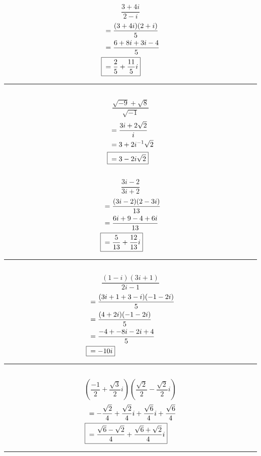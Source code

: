 	\subsection{}
		\[\frac{3 + 4i}{2 - i}\]
		\begin{align*}
			&= \frac{(3 + 4i)(2 + i)}{5} \\
			&= \frac{6 + 8i + 3i - 4}{5} \\
			\Aboxed{{} &= \frac{2}{5} + \frac{11}{5}i}
		\end{align*}
		\hrule{}

	\subsection{}
		\[\frac{\sqrt{-9} + \sqrt{8}}{\sqrt{-1}}\]
		\begin{align*}
			&= \frac{3i + 2\sqrt{2}}{i} \\
			&= 3 + 2i^{-1}\sqrt{2} \\
			\Aboxed{{} &= 3 - 2i\sqrt{2}}
		\end{align*}

	\subsection{}
		\[\frac{3i - 2}{3i + 2}\]
		\begin{align*}
			&= \frac{(3i - 2)(2 - 3i)}{13} \\
			&= \frac{6i + 9 - 4 + 6i}{13} \\
			\Aboxed{{} &= \frac{5}{13} + \frac{12}{13}i}
		\end{align*}
		\hrule{}

	\subsection{}
		\[\frac{(1 - i)(3i + 1)}{2i - 1}\]
		\begin{align*}
			&= \frac{(3i + 1 + 3 - i)(-1 - 2i)}{5} \\
			&= \frac{(4 + 2i)(-1 - 2i)}{5} \\
			&= \frac{-4 + -8i - 2i + 4}{5} \\
			\Aboxed{{} &= -10i}
		\end{align*}
		\hrule{}

	\subsection{}
		\[\left(\frac{-1}{2} + \frac{\sqrt{3}}{2}i\right)\left(\frac{\sqrt{2}}{2} - \frac{\sqrt{2}}{2}i\right)\]
		\begin{align*}
			&= -\frac{\sqrt{2}}{4} + \frac{\sqrt{2}}{4}i + \frac{\sqrt{6}}{4}i + \frac{\sqrt{6}}{4} \\
			\Aboxed{{} &= \frac{\sqrt{6} - \sqrt{2}}{4} + \frac{\sqrt{6} + \sqrt{2}}{4}i}
		\end{align*}
		\hrule{}

